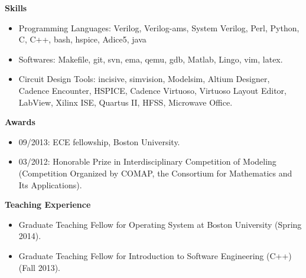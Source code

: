 \documentclass[]{article}
\begin{document}
\noindent \textbf{Skills}
\begin{itemize}
\item Programming Languages:  Verilog, Verilog-ams, System Verilog, Perl,
Python, C, C++, bash, hspice, Adice5, java
\item Softwares:  Makefile, git, svn, ema, qemu, gdb, Matlab, Lingo, vim, latex.
\item Circuit Design Tools:  incisive, simvision, Modelsim, Altium Designer,
Cadence Encounter, HSPICE, Cadence Virtuoso, Virtuoso Layout Editor, LabView,
Xilinx ISE, Quartus II, HFSS, Microwave Office. 

\end{itemize}
\noindent \textbf{Awards}
\begin{itemize}
\item 09/2013:  ECE fellowship, Boston University.

\item 03/2012:  Honorable Prize in Interdisciplinary Competition of Modeling
(Competition Organized by COMAP, the Consortium for Mathematics and Its
Applications).



\end{itemize}

\noindent \textbf{Teaching Experience}
\begin{itemize}
\item Graduate Teaching Fellow for Operating System at Boston University
(Spring 2014).
\item Graduate Teaching Fellow for Introduction to Software Engineering (C++) (Fall
2013).
\end{itemize}
\end{document}
